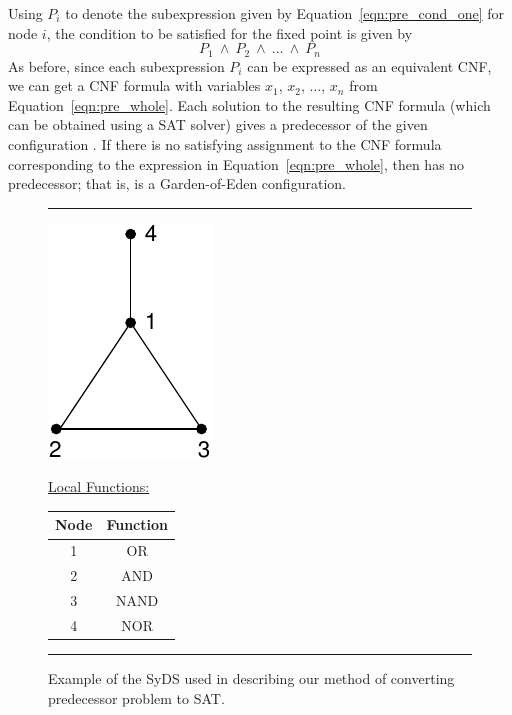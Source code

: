 Using $P_i$ to denote the subexpression given by Equation~\eqref{eqn:pre_cond_one}
for node $i$, the condition to be satisfied for the fixed point is given by 
\begin{equation}\label{eqn:pre_whole}
P_1 ~\wedge~ P_2 ~\wedge~ \ldots ~\wedge~ P_n
\end{equation}
As before, since each subexpression $P_i$ can be expressed as an equivalent CNF, 
we can get a CNF formula with variables $x_1$, $x_2$, $\ldots$, $x_n$
from Equation~\eqref{eqn:pre_whole}. 
Each solution to the resulting CNF formula (which can be obtained using
a SAT solver) gives a predecessor of the given configuration \calc.
If there is no satisfying assignment to the CNF formula corresponding
to the expression in Equation~\eqref{eqn:pre_whole}, then \calc{}
has no predecessor; that is, \calc{} is a Garden-of-Eden configuration.

\medskip


\begin{figure}[tbh]
\rule{\textwidth}{0.01in}
\begin{minipage}{0.3\textwidth}
\centering
\includegraphics[scale=0.7]{./graph_example.pdf}
\end{minipage}
\hspace*{0.5in}
\begin{minipage}{0.6\textwidth}
\underline{\textsf{Local Functions:}}

\smallskip

\noindent
\begin{tabular}{|c|c|}\hline
\textbf{Node} & \textbf{Function} \\ \hline
1  &  OR \\ \hline
2  &  AND \\ \hline
3  &  NAND \\ \hline
4  &  NOR \\ \hline
\end{tabular}
\end{minipage}
\caption{\smallskip \small{Example of the SyDS used in describing
our method of converting predecessor problem to SAT.}\medskip}
\label{fig:syds_ex}
\rule{\textwidth}{0.01in}
\end{figure}

